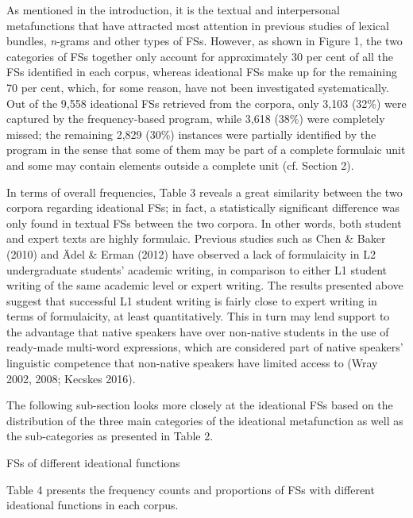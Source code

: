 \begin{styleStandard}
As mentioned in the introduction, it is the textual and interpersonal metafunctions that have attracted most attention in previous studies of lexical bundles, \textit{n}{}-grams and other types of FSs. However, as shown in Figure 1, the two categories of FSs together only account for approximately 30 per cent of all the FSs identified in each corpus, whereas ideational FSs make up for the remaining 70 per cent, which, for some reason, have not been investigated systematically. Out of the 9,558 ideational FSs retrieved from the corpora, only 3,103 (32\%) were captured by the frequency-based program, while 3,618 (38\%) were completely missed; the remaining 2,829 (30\%) instances were partially identified by the program in the sense that some of them may be part of a complete formulaic unit and some may contain elements outside a complete unit (cf. Section 2). 
\end{styleStandard}

\begin{styleStandard}
In terms of overall frequencies, Table 3 reveals a great similarity between the two corpora regarding ideational FSs; in fact, a statistically significant difference was only found in textual FSs between the two corpora. In other words, both student and expert texts are highly formulaic. Previous studies such as Chen \& Baker (2010) and Ädel \& Erman (2012) have observed a lack of formulaicity in L2 undergraduate students’ academic writing, in comparison to either L1 student writing of the same academic level or expert writing. The results presented above suggest that successful L1 student writing is fairly close to expert writing in terms of formulaicity, at least quantitatively. This in turn may lend support to the advantage that native speakers have over non-native students in the use of ready-made multi-word expressions, which are considered part of native speakers’ linguistic competence that non-native speakers have limited access to (Wray 2002, 2008; Kecskes 2016). \ 
\end{styleStandard}

\begin{styleStandard}
The following sub-section looks more closely at the ideational FSs based on the distribution of the three main categories of the ideational metafunction as well as the sub-categories as presented in Table 2.
\end{styleStandard}

\begin{listWWNumxivleveli}
\item 
\begin{listWWNumxivlevelii}
\item 
\begin{stylelsSectionii}
FSs of different ideational functions 
\end{stylelsSectionii}
\end{listWWNumxivlevelii}
\end{listWWNumxivleveli}
\begin{styleStandard}
Table 4 presents the frequency counts and proportions of FSs with different ideational functions in each corpus.
\end{styleStandard}


